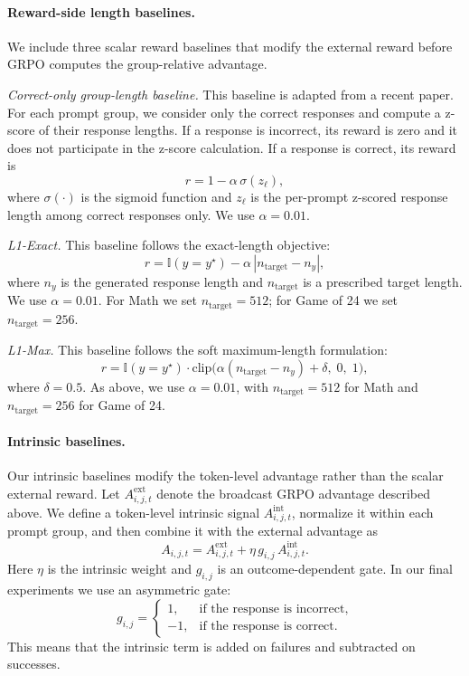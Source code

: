 \paragraph{Reward-side length baselines.}
We include three scalar reward baselines that modify the external reward before GRPO computes the group-relative advantage.

\emph{Correct-only group-length baseline.}
This baseline is adapted from a recent paper. For each prompt group, we consider only the correct responses and compute a z-score of their response lengths. If a response is incorrect, its reward is zero and it does not participate in the z-score calculation. If a response is correct, its reward is
\[
r = 1 - \alpha \, \sigma(z_{\ell}),
\]
where \(\sigma(\cdot)\) is the sigmoid function and \(z_{\ell}\) is the per-prompt z-scored response length among correct responses only. We use \(\alpha = 0.01\).

\emph{L1-Exact.}
This baseline follows the exact-length objective:
\[
r = \mathbb{I}(y = y^\star) - \alpha \, |n_{\mathrm{target}} - n_y|,
\]
where \(n_y\) is the generated response length and \(n_{\mathrm{target}}\) is a prescribed target length. We use \(\alpha = 0.01\). For Math we set \(n_{\mathrm{target}} = 512\); for Game of 24 we set \(n_{\mathrm{target}} = 256\).

\emph{L1-Max.}
This baseline follows the soft maximum-length formulation:
\[
r = \mathbb{I}(y = y^\star)\cdot \mathrm{clip}\big(\alpha (n_{\mathrm{target}} - n_y) + \delta,\; 0,\; 1\big),
\]
where \(\delta = 0.5\). As above, we use \(\alpha = 0.01\), with \(n_{\mathrm{target}} = 512\) for Math and \(n_{\mathrm{target}} = 256\) for Game of 24.

\paragraph{Intrinsic baselines.}
Our intrinsic baselines modify the token-level advantage rather than the scalar external reward. Let \(A^{\mathrm{ext}}_{i,j,t}\) denote the broadcast GRPO advantage described above. We define a token-level intrinsic signal \(A^{\mathrm{int}}_{i,j,t}\), normalize it within each prompt group, and then combine it with the external advantage as
\[
A_{i,j,t} = A^{\mathrm{ext}}_{i,j,t} + \eta \, g_{i,j} \, A^{\mathrm{int}}_{i,j,t}.
\]
Here \(\eta\) is the intrinsic weight and \(g_{i,j}\) is an outcome-dependent gate. In our final experiments we use an asymmetric gate:
\[
g_{i,j} =
\begin{cases}
1, & \text{if the response is incorrect}, \\
-1, & \text{if the response is correct}.
\end{cases}
\]
This means that the intrinsic term is added on failures and subtracted on successes.

